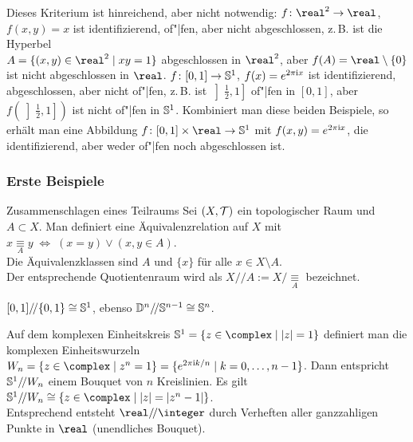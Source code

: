 \begin{Bem}
    Dieses Kriterium ist hinreichend, aber nicht notwendig:
    $f\colon \real^2 \rightarrow \real$, $f(x, y) = x$ ist identifizierend,
    of"|fen, aber nicht abgeschlossen,
    z.\,B. ist die Hyperbel \\
    $A = \{(x, y) \in \real^2 \;|\; xy = 1\}$ abgeschlossen in $\real^2$, aber
    $f(A) = \real \setminus \{0\}$ ist nicht abgeschlossen in $\real$.
    $f\colon [0, 1] \rightarrow \mathbb{S}^1$, $f(x) = e^{2\pi \mathrm{i} x}$ ist
    identifizierend, abgeschlossen, aber nicht of"|fen,
    z.\,B. ist $\left]\frac{1}{2}, 1\right]$ of"|fen in $[0,1]$, aber
    $f\left(\left]\frac{1}{2}, 1\right]\right)$ ist nicht of"|fen in
    $\mathbb{S}^1$.
    Kombiniert man diese beiden Beispiele, so erhält man eine Abbildung
    $f\colon [0, 1] \times \real \rightarrow \sphere^1$ mit
    $f(x, y) = e^{2\pi \mathrm{i} x}$, die identifizierend,
    aber weder of"|fen noch abgeschlossen ist.
\end{Bem}

\subsubsection{%
    Erste Beispiele%
}

\begin{Def}{Zusammenschlagen eines Teilraums}
    Sei $(X, \mathcal{T})$ ein topologischer Raum und $A \subset X$.
    Man definiert eine Äquivalenzrelation auf $X$ mit
    $x \underset{A}{\equiv} y \;\Leftrightarrow\;
    (x = y) \lor (x, y \in A)$. \\
    Die Äquivalenzklassen sind $A$ und $\{x\}$ für alle
    $x \in X \setminus A$. \\
    Der entsprechende Quotientenraum wird als
    $X/\!/A := X/\!\underset{A}{\equiv}$ bezeichnet.
\end{Def}

\begin{Bsp}
    $[0, 1]/\!/\{0,1\} \cong \mathbb{S}^1$, ebenso
    $\mathbb{D}^n/\!/\mathbb{S}^{n-1} \cong \mathbb{S}^n$.
\end{Bsp}

\begin{Bsp}
    Auf dem komplexen Einheitskreis
    $\sphere^1 = \{z \in \complex \;|\; |z| = 1\}$ definiert man die
    komplexen Einheitswurzeln $W_n = \{z \in \complex \;|\; z^n = 1\} =
    \{e^{2 \pi \i k/n} \;|\; k = 0, \dotsc, n - 1\}$.
    Dann entspricht $\mathbb{S}^1 /\!/ W_n$ einem Bouquet von $n$ Kreislinien.
    Es gilt $\sphere^1 /\!/ W_n \cong
    \{z \in \complex \;|\; |z| = |z^n - 1|\}$. \\
    Entsprechend entsteht $\real /\!/ \integer$ durch Verheften aller
    ganzzahligen Punkte in $\real$
    (unendliches Bouquet).
\end{Bsp}

